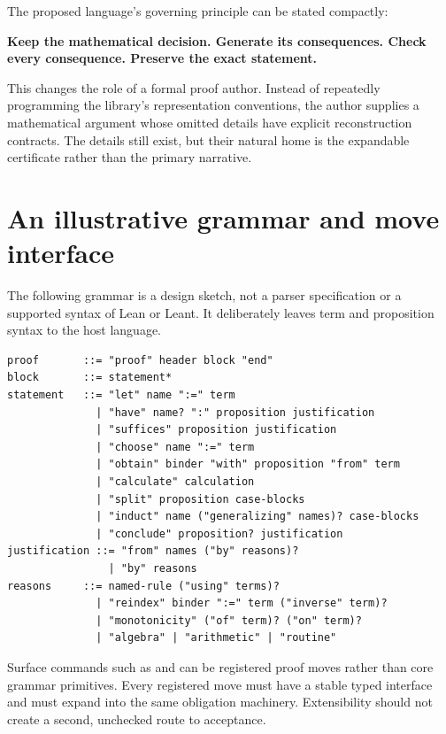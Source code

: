 \documentclass[11pt,a4paper]{article}
\newcommand{\code}[1]{\texttt{\detokenize{#1}}}
\theoremstyle{remark}
\begin{document}
The proposed language's governing principle can be stated compactly:
\begin{designbox}
\textbf{Keep the mathematical decision. Generate its consequences. Check every consequence. Preserve the exact statement.}
\end{designbox}
This changes the role of a formal proof author. Instead of repeatedly programming the library's representation conventions, the author supplies a mathematical argument whose omitted details have explicit reconstruction contracts. The details still exist, but their natural home is the expandable certificate rather than the primary narrative.

\clearpage
\appendix
\section{An illustrative grammar and move interface}
\label{app:grammar}
The following grammar is a design sketch, not a parser specification or a supported syntax of Lean or Leant. It deliberately leaves term and proposition syntax to the host language.
\par\noindent\begin{minipage}{\linewidth}
\begin{lstlisting}[caption={A small possible controlled proof grammar.}]
proof       ::= "proof" header block "end"
block       ::= statement*
statement   ::= "let" name ":=" term
              | "have" name? ":" proposition justification
              | "suffices" proposition justification
              | "choose" name ":=" term
              | "obtain" binder "with" proposition "from" term
              | "calculate" calculation
              | "split" proposition case-blocks
              | "induct" name ("generalizing" names)? case-blocks
              | "conclude" proposition? justification
justification ::= "from" names ("by" reasons)?
                | "by" reasons
reasons     ::= named-rule ("using" terms)?
              | "reindex" binder ":=" term ("inverse" term)?
              | "monotonicity" ("of" term)? ("on" term)?
              | "algebra" | "arithmetic" | "routine"
\end{lstlisting}
\end{minipage}\par
Surface commands such as \code{multiply} and \code{divide_by} can be registered proof moves rather than core grammar primitives. Every registered move must have a stable typed interface and must expand into the same obligation machinery. Extensibility should not create a second, unchecked route to acceptance.
\end{document}
